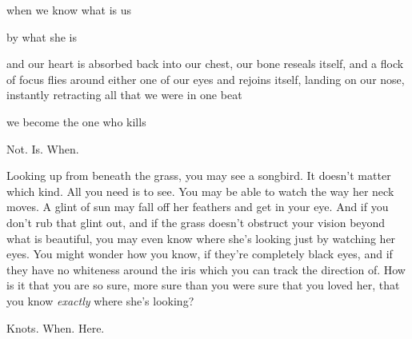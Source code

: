 \documentclass[11pt]{article}
\begin{document}
\begingroup
\begin{center}
when we know what is us
\rightskip\leftskip
\end{center}
\endgroup

\begingroup
\begin{center}
by what she is
\rightskip\leftskip
\end{center}
\endgroup

\begingroup
\begin{center}
and our heart is absorbed back into our chest, our bone reseals itself, and a flock of focus flies around either one of our eyes and rejoins itself, landing on our nose, instantly retracting all that we were in one beat
\rightskip\leftskip
\end{center}
\endgroup

\begingroup
\begin{center}
we become the one who kills
\rightskip\leftskip
\end{center}
\endgroup

\vspace*{4\baselineskip}

\begingroup
\begin{center}
Not. Is. When.
\rightskip\leftskip
\end{center}
\endgroup

\vspace*{4\baselineskip}

\begingroup
Looking up from beneath the grass, you may see a songbird. It doesn't matter which kind. All you need is to see. You may be able to watch the way her neck moves. A glint of sun may fall off her feathers and get in your eye. And if you don't rub that glint out, and if the grass doesn't obstruct your vision beyond what is beautiful, you may even know where she's looking just by watching her eyes. You might wonder how you know, if they're completely black eyes, and if they have no whiteness around the iris which you can track the direction of. How is it that you are so sure, more sure than you were sure that you loved her, that you know \textit{exactly} where she's looking?
\endgroup

\vspace*{4\baselineskip}

\begingroup
\begin{center}
Knots. When. Here.
\rightskip\leftskip
\end{center}
\endgroup
\end{document}
